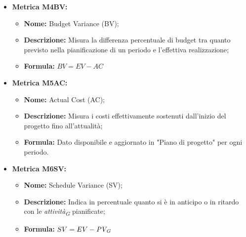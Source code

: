 \begin{itemize}
    \vspace{0.4cm}
    \item \hypertarget{item:M4BV}{\textbf{Metrica M4BV:}}
    \vspace{0.2cm}

    \begin{minipage}[H]{0.9\textwidth}
        \begin{itemize}
            \item \textbf{Nome:} Budget Variance (BV);
            \item \textbf{Descrizione:} Misura la differenza percentuale di budget tra quanto previsto nella pianificazione di un periodo e l’effettiva realizzazione;
            \item \textbf{Formula:} $BV = EV - AC $
        \end{itemize}
    \end{minipage}

    \vspace{0.4cm}
    \item \hypertarget{item:M5AC}{\textbf{Metrica M5AC:}}
    \vspace{0.2cm}

    \begin{minipage}[H]{0.9\textwidth}
        \begin{itemize}
            \item \textbf{Nome:} Actual Cost (AC);
            \item \textbf{Descrizione:} Misura i costi effettivamente sostenuti dall’inizio del progetto fino all’attualità; 
            \item \textbf{Formula:} Dato disponibile e aggiornato in "Piano di progetto" per ogni periodo.
        \end{itemize}
    \end{minipage}

    \vspace{0.4cm}  
    \item \hypertarget{item:M6SV}{\textbf{Metrica M6SV:}}
    \vspace{0.2cm}
    
    \begin{minipage}[H]{0.9\textwidth}
        \begin{itemize}
            \item \textbf{Nome:} Schedule Variance (SV);
            \item \textbf{Descrizione:} Indica in percentuale quanto si è in anticipo o in ritardo con le \textit{attività}\textsubscript{\textit{G}} pianificate;
            \item \textbf{Formula:} $SV = EV - \textit{PV}\textsubscript{\textit{G}}$
        \end{itemize}
    \end{minipage}


\end{itemize}
